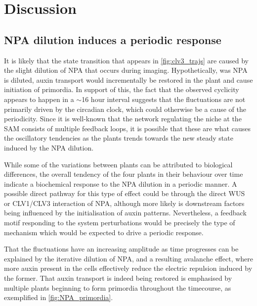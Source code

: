 \chapter{Discussion}

\ifpdf
\graphicspath{{Chapter4/Figs/Raster/}{Chapter4/Figs/PDF/}{Chapter4/Figs/}}
\else
\graphicspath{{Chapter4/Figs/Vector/}{Chapter4/Figs/}}
\fi

\section{NPA dilution induces a periodic response}
It is likely that the state transition that appears in \cref{fig:clv3_trajs} are
caused by the slight dilution of NPA that occurs during imaging. Hypothetically,
was NPA is diluted, auxin transport would incrementally be restored in the plant
and cause initiation of primordia. In support of this, the fact that the
observed cyclicity appears to  
happen in a $\sim$16 hour interval suggests that the fluctuations are not
primarily driven by the circadian clock, which could otherwise be a cause of the
periodicity. Since it is well-known that the network regulating
the niche at the SAM consists of multiple feedback loops, it is
possible that these are what causes the oscillatory tendencies as the
plants trends towards the new steady state induced by the NPA dilution.

While some of the variations between plants can be attributed to biological
differences, the overall tendency of the four plants in their behaviour over
time indicate a biochemical response to the NPA dilution in a periodic manner. A
possible direct pathway for this type of effect could be through the direct WUS
or CLV1/CLV3 interaction of NPA, although more likely is downstream factors
being influenced by the initialisation of auxin patterns. Nevertheless, a
feedback motif responding to the system perturbations would be precisely the
type of mechanism which would be expected to drive a periodic response.

That the fluctuations have an increasing amplitude as time progresses can be
explained by the iterative dilution of NPA, and a resulting avalanche effect,
where more auxin present in the cells effectively reduce the
electric repulsion induced by the former. That auxin transport is indeed being
restored is emphasised by multiple plants beginning to form primordia throughout
the timecourse, as exemplified in \cref{fig:NPA_primordia}.

